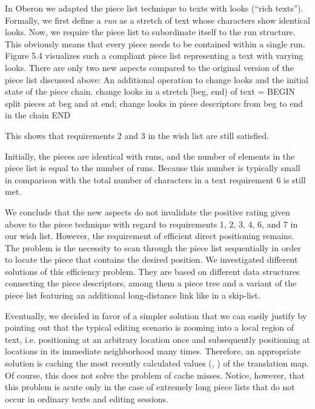 In Oberon we adapted the piece list technique to texts with looks
(``rich texts''). Formally, we first define a \emph{run} as a stretch of text
whose characters show identical looks. Now, we require the piece list
to subordinate itself to the run structure. This obviously means that
every piece needs to be contained within a single run. Figure 5.4
visualizes such a compliant piece list representing a text with
varying looks. There are only two new aspects compared to the original
version of the piece list discussed above: An additional operation to
change looks and the initial state of the piece chain.
\begintt
change looks in a stretch [beg, end) of text = BEGIN
  split pieces at beg and at end;
  change looks in piece descriptors from beg to end in the chain
END
\endtt

\noindent This shows that requirements 2 and 3 in the wish list are still satisfied.


Initially, the pieces are identical with runs, and the number of elements in the piece list is equal to the number of runs. Because this number is typically small in comparison with the total number of characters in a text requirement 6 is still met.

We conclude that the new aspects do not invalidate the positive rating given above to the piece technique with regard to requirements 1, 2, 3, 4, 6, and 7 in our wish list. However, the requirement of efficient direct positioning remains. The problem is the necessity to scan through the piece list sequentially in order to locate the piece that contains the desired position. We investigated different solutions of this efficiency problem. They are based on different data structures connecting the piece descriptors, among them a piece tree and a variant of the piece list featuring an additional long-distance link like in a skip-list.

Eventually, we decided in favor of a simpler solution that we can easily justify by pointing out that the typical editing scenario is zooming into a local region of text, i.e. positioning at an arbitrary location once and subsequently positioning at locations in its immediate neighborhood many times. Therefore, an appropriate solution is caching the most recently calculated values (, ) of the translation map. Of course, this does not solve the problem of cache misses. Notice, however, that this problem is acute only in the case of extremely long piece lists that do not occur in ordinary texts and editing sessions.

